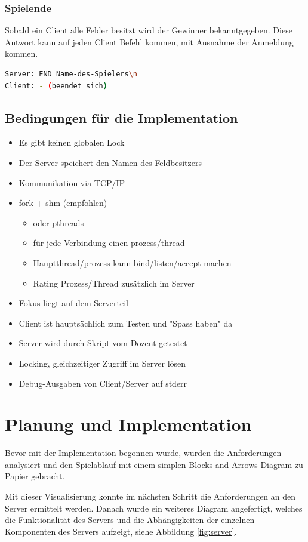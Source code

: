 \subsection{Spielende}
Sobald ein Client alle Felder besitzt wird der Gewinner bekanntgegeben. Diese Antwort kann auf jeden Client Befehl kommen, mit Ausnahme der Anmeldung kommen.
\begin{lstlisting}[language=bash,caption={Spielstart}]
Server: END Name-des-Spielers\n
Client: - (beendet sich)
\end{lstlisting}

\section{Bedingungen für die Implementation}
\begin{itemize}
	\item Es gibt keinen globalen Lock
	\item Der Server speichert den Namen des Feldbesitzers
	\item Kommunikation via TCP/IP
	\item fork + shm (empfohlen)
	\begin{itemize}
		\item oder pthreads
		\item für jede Verbindung einen prozess/thread
		\item Hauptthread/prozess kann bind/listen/accept machen
		\item Rating Prozess/Thread zusätzlich im Server
	\end{itemize}
	\item Fokus liegt auf dem Serverteil
	\item Client ist hauptsächlich zum Testen und "Spass haben" da
	\item Server wird durch Skript vom Dozent getestet
	\item Locking, gleichzeitiger Zugriff im Server lösen
	\item Debug-Ausgaben von Client/Server auf stderr
\end{itemize}

\chapter{Planung und Implementation}
Bevor mit der Implementation begonnen wurde, wurden die Anforderungen analysiert und den Spielablauf mit einem simplen Blocks-and-Arrows Diagram zu Papier gebracht.

Mit dieser Visualisierung konnte im nächsten Schritt die Anforderungen an den Server ermittelt werden. Danach wurde ein weiteres Diagram angefertigt, welches die Funktionalität des Servers und die Abhängigkeiten der einzelnen Komponenten des Servers aufzeigt, siehe Abbildung \ref{fig:server}.

